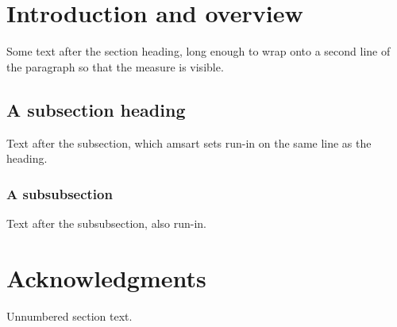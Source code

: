 \documentclass{amsart}
\begin{document}
\section{Introduction and overview}
Some text after the section heading, long enough to wrap onto a second line of the
paragraph so that the measure is visible.
\subsection{A subsection heading}
Text after the subsection, which amsart sets run-in on the same line as the heading.
\subsubsection{A subsubsection}
Text after the subsubsection, also run-in.
\section*{Acknowledgments}
Unnumbered section text.
\end{document}

